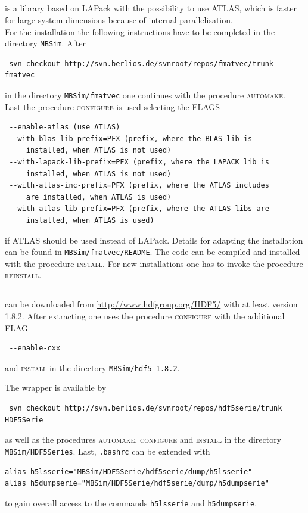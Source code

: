 \subsection{\FMatVec{}}
\FMatVec{} is a library based on LAPack with the possibility to use ATLAS, which is faster for large system dimensions because of internal parallelisation.\\
For the installation the following instructions have to be completed in the directory \texttt{MBSim}. After
\begin{verbatim}
 svn checkout http://svn.berlios.de/svnroot/repos/fmatvec/trunk fmatvec
\end{verbatim}
in the directory \texttt{MBSim/fmatvec} one continues with the procedure \textsc{automake}.\\
Last the procedure \textsc{configure} is used selecting the FLAGS
\begin{verbatim}
 --enable-atlas (use ATLAS)
 --with-blas-lib-prefix=PFX (prefix, where the BLAS lib is
     installed, when ATLAS is not used)
 --with-lapack-lib-prefix=PFX (prefix, where the LAPACK lib is
     installed, when ATLAS is not used)
 --with-atlas-inc-prefix=PFX (prefix, where the ATLAS includes 
     are installed, when ATLAS is used)
 --with-atlas-lib-prefix=PFX (prefix, where the ATLAS libs are
     installed, when ATLAS is used)
\end{verbatim}
if ATLAS should be used instead of LAPack. Details for adapting the installation can be found in \texttt{MBSim/fmatvec/README}. The code can be compiled and installed with the procedure \textsc{install}. For new installations one has to invoke the procedure \textsc{reinstall}.

\subsection{\HDF}
\HDF can be downloaded from \url{http://www.hdfgroup.org/HDF5/} with at least version 1.8.2. After extracting one uses the procedure \textsc{configure} with the additional FLAG
\begin{verbatim}
 --enable-cxx
\end{verbatim}
and \textsc{install} in the directory \texttt{MBSim/hdf5-1.8.2}.

The \HDF wrapper is available by
\begin{verbatim}
 svn checkout http://svn.berlios.de/svnroot/repos/hdf5serie/trunk HDF5Serie
\end{verbatim}
as well as the procedures \textsc{automake, configure} and \textsc{install} in the directory \texttt{MBSim/HDF5Series}. Last, \texttt{.bashrc} can be extended with
\begin{verbatim}
alias h5lsserie="MBSim/HDF5Serie/hdf5serie/dump/h5lsserie"
alias h5dumpserie="MBSim/HDF5Serie/hdf5serie/dump/h5dumpserie"
\end{verbatim}
to gain overall access to the commands \texttt{h5lsserie} and \texttt{h5dumpserie}.

